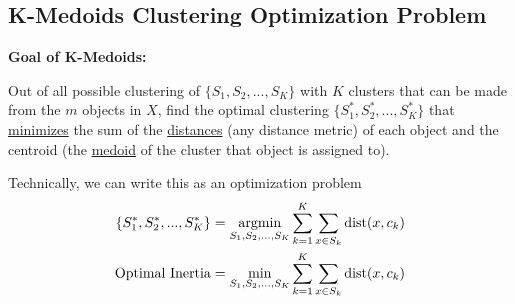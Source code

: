 \documentclass[11pt]{elegantbook}
\newcommand{\argmin}{\operatornamewithlimits{argmin}}
\begin{document}
\subsection{K-Medoids Clustering Optimization Problem}

\textbf{Goal of K-Medoids:}

Out of all possible clustering of $\{S_1 ,S_2 , ... , S_K\}$ with $K$ clusters that can be made from the $m$ objects in $X$, find the optimal clustering $\{S_1^*,S_2^*,...,S_K^*\}$ that \underline{minimizes} the sum of the \underline{distances} (any distance metric) of each object and the centroid (the \underline{medoid} of the cluster that object is assigned to).

Technically, we can write this as an optimization problem
\begin{equation}
    \begin{aligned}
        \{S_1^*,S_2^*,...,S_K^*\}=\argmin_{S_1,S_2,...,S_K}\sum_{k=1}^K\sum_{x\in S_k}\textnormal{dist}(x,c_k)\\
        \textnormal{Optimal Inertia}=\min_{S_1,S_2,...,S_K}\sum_{k=1}^K\sum_{x\in S_k}\textnormal{dist}(x,c_k)\\
    \end{aligned}
    \nonumber
\end{equation}
\end{document}
